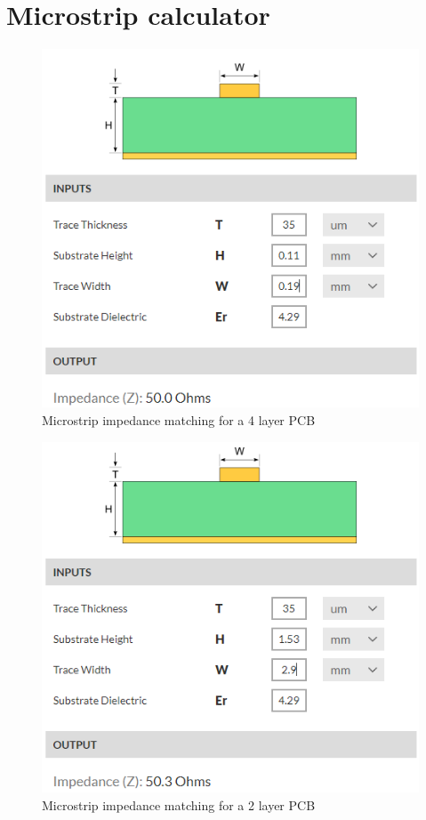 \chapter{Microstrip calculator}
\begin{figure}[h!]
\centering
\includegraphics[scale=0.8]{figures/PCBmatching4.PNG}
\caption{Microstrip impedance matching for a 4 layer PCB\cite{MicrostripCalcu}}
\end{figure}

\begin{figure}[h!]
\centering
\includegraphics[scale=0.8]{figures/PCBmatching2.PNG}
\caption{Microstrip impedance matching for a 2 layer PCB\cite{MicrostripCalcu}}
\end{figure}